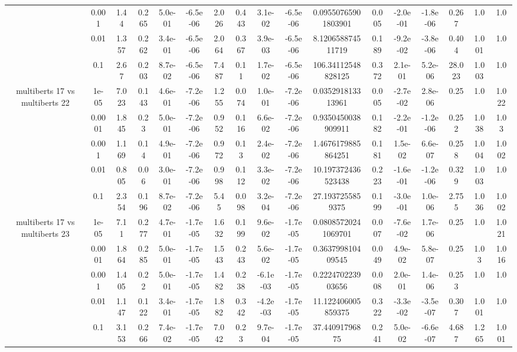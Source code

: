 \begin{tabular}{|c|c|c|c|c|c|c|c|c|c|c|c|c|c|c|c|c|}
 & 0.001 & 1.44 & 0.265 & 5.0e-01 & -6.5e-06 & 2.026 & 0.443 & 3.1e-02 & -6.5e-06 & 0.09550765901803901 & 0.005 & -2.0e-01 & -1.8e-06 & 0.267 & 1.0 & 1.0 \\
 & 0.01 & 1.357 & 0.262 & 3.4e-01 & -6.5e-06 & 2.064 & 0.367 & 3.9e-03 & -6.5e-06 & 8.120658874511719 & 0.189 & -9.2e-02 & -3.8e-06 & 0.404 & 1.001 & 1.0 \\
 & 0.1 & 2.67 & 0.203 & 8.7e-02 & -6.5e-06 & 7.487 & 0.11 & 1.7e-02 & -6.5e-06 & 106.34112548828125 & 0.372 & 2.1e-01 & 5.2e-06 & 28.023 & 1.003 & 1.0 \\
\hline
\multirow{5}{*}{multiberts 17 vs multiberts 22} & 1e-05 & 7.023 & 0.143 & 4.6e-01 & -7.2e-06 & 1.255 & 0.074 & 1.0e-01 & -7.2e-06 & 0.035291813313961 & 0.005 & -2.7e-02 & 2.8e-06 & 0.25 & 1.0 & 1.022 \\
 & 0.0001 & 1.845 & 0.23 & 5.0e-01 & -7.2e-06 & 0.952 & 0.116 & 6.6e-02 & -7.2e-06 & 0.9350450038909911 & 0.182 & -2.2e-01 & -1.2e-06 & 0.252 & 1.038 & 1.03 \\
 & 0.001 & 1.169 & 0.14 & 4.9e-01 & -7.2e-06 & 0.972 & 0.13 & 2.4e-02 & -7.2e-06 & 1.4676179885864251 & 0.181 & 1.5e-02 & 6.6e-07 & 0.258 & 1.004 & 1.002 \\
 & 0.01 & 0.805 & 0.06 & 3.0e-01 & -7.2e-06 & 0.998 & 0.112 & 3.3e-02 & -7.2e-06 & 10.197372436523438 & 0.223 & -1.6e-01 & -1.2e-06 & 0.329 & 1.003 & 1.0 \\
 & 0.1 & 2.354 & 0.196 & 8.7e-02 & -7.2e-06 & 5.45 & 0.098 & 3.2e-04 & -7.2e-06 & 27.1937255859375 & 0.199 & -3.0e-01 & 1.0e-06 & 2.755 & 1.036 & 1.002 \\
\hline
\multirow{5}{*}{multiberts 17 vs multiberts 23} & 1e-05 & 7.11 & 0.277 & 4.7e-01 & -1.7e-05 & 1.632 & 0.199 & 9.6e-02 & -1.7e-05 & 0.08085720241069701 & 0.007 & -7.6e-02 & 1.7e-06 & 0.25 & 1.0 & 1.021 \\
 & 0.0001 & 1.864 & 0.285 & 5.0e-01 & -1.7e-05 & 1.543 & 0.243 & 5.6e-02 & -1.7e-05 & 0.363799810409545 & 0.049 & 4.9e-02 & 5.8e-07 & 0.25 & 1.03 & 1.016 \\
 & 0.001 & 1.405 & 0.22 & 5.0e-01 & -1.7e-05 & 1.482 & 0.238 & -6.1e-03 & -1.7e-05 & 0.222470223903656 & 0.008 & 2.0e-01 & 1.4e-06 & 0.253 & 1.0 & 1.0 \\
 & 0.01 & 1.147 & 0.122 & 3.4e-01 & -1.7e-05 & 1.882 & 0.342 & -4.2e-03 & -1.7e-05 & 11.122406005859375 & 0.322 & -3.3e-02 & -3.5e-07 & 0.307 & 1.001 & 1.0 \\
 & 0.1 & 3.153 & 0.266 & 7.4e-02 & -1.7e-05 & 7.042 & 0.23 & 9.7e-04 & -1.7e-05 & 37.44091796875 & 0.241 & 5.0e-02 & -6.6e-07 & 4.687 & 1.265 & 1.001 \\

\end{tabular}
